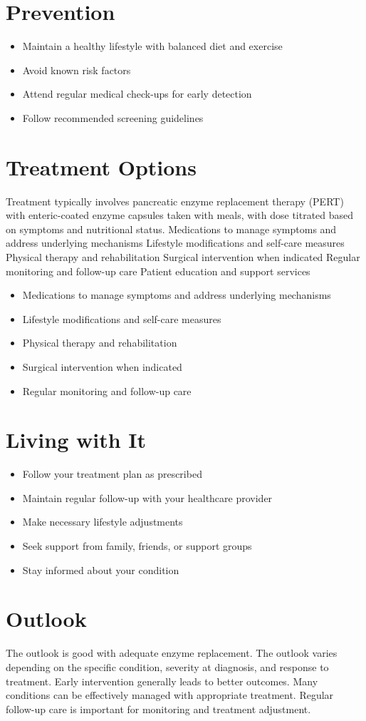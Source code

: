 \section{Prevention}
\begin{itemize}[noitemsep]
  \item Maintain a healthy lifestyle with balanced diet and exercise
  \item Avoid known risk factors
  \item Attend regular medical check-ups for early detection
  \item Follow recommended screening guidelines
\end{itemize}
\section{Treatment Options}
Treatment typically involves pancreatic enzyme replacement therapy (PERT) with enteric-coated enzyme capsules taken with meals, with dose titrated based on symptoms and nutritional status. Medications to manage symptoms and address underlying mechanisms Lifestyle modifications and self-care measures Physical therapy and rehabilitation Surgical intervention when indicated Regular monitoring and follow-up care Patient education and support services

\begin{itemize}[noitemsep]
  \item Medications to manage symptoms and address underlying mechanisms
  \item Lifestyle modifications and self-care measures
  \item Physical therapy and rehabilitation
  \item Surgical intervention when indicated
  \item Regular monitoring and follow-up care
\end{itemize}
\section{Living with It}
\begin{itemize}[noitemsep]
  \item Follow your treatment plan as prescribed
  \item Maintain regular follow-up with your healthcare provider
  \item Make necessary lifestyle adjustments
  \item Seek support from family, friends, or support groups
  \item Stay informed about your condition
\end{itemize}
\section{Outlook}
The outlook is good with adequate enzyme replacement. The outlook varies depending on the specific condition, severity at diagnosis, and response to treatment. Early intervention generally leads to better outcomes. Many conditions can be effectively managed with appropriate treatment. Regular follow-up care is important for monitoring and treatment adjustment.

